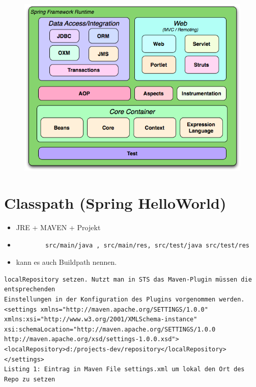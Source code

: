 \documentclass[a4paper,10pt]{scrreprt}
\begin{document}
\begin{figure}[h]
 \centering
 \includegraphics[scale=0.4,keepaspectratio=true]{./spring_framework.png}
\end{figure}


\section{Classpath (Spring HelloWorld) }
\begin{itemize}
 \item JRE + MAVEN + Projekt
 \item \begin{verbatim}
        src/main/java , src/main/res, src/test/java src/test/res 
       \end{verbatim}
 \item kann es auch Buildpath nennen.

\end{itemize}


\begin{verbatim}
localRepository setzen. Nutzt man in STS das Maven-Plugin müssen die entsprechenden
Einstellungen in der Konfiguration des Plugins vorgenommen werden.
<settings xmlns="http://maven.apache.org/SETTINGS/1.0.0"
xmlns:xsi="http://www.w3.org/2001/XMLSchema-instance"
xsi:schemaLocation="http://maven.apache.org/SETTINGS/1.0.0
http://maven.apache.org/xsd/settings-1.0.0.xsd">
<localRepository>d:/projects-dev/repository</localRepository>
</settings>
Listing 1: Eintrag in Maven File settings.xml um lokal den Ort des Repo zu setzen
 
\end{verbatim}
\end{document}
